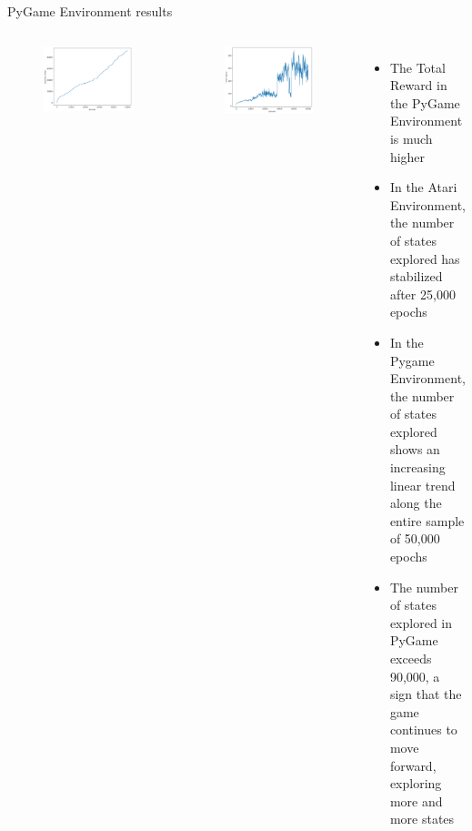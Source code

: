 \begin{frame}{PyGame Environment results}
    \begin{columns}[c,onlytextwidth]
            \begin{figure}
                \centering
                \includegraphics[width=\textwidth]{images/pygame-explored-states.png}
            \end{figure}
            \begin{figure}
                \includegraphics[width=\textwidth]{images/pygame-total-reward.png}
            \end{figure}
	    \begin{itemize}
		\item The Total Reward in the PyGame Environment is much higher
		\item In the Atari Environment, the number of states explored has stabilized after 25,000 epochs
		\item In the Pygame Environment, the number of states explored shows an increasing linear trend along the entire sample of 50,000 epochs
		\item The number of states explored in PyGame exceeds 90,000, a sign that the game continues to move forward, exploring more and more states
	    \end{itemize}
    \end{columns}
\end{frame}
